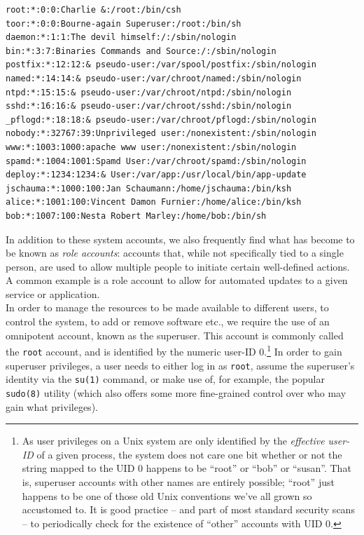 \begin{lstlisting}[float,label=code:cat-passwd,caption={Excerpt of a
typical {\tt /etc/passwd} file on a NetBSD system\index{\tt apache}}]
root:*:0:0:Charlie &:/root:/bin/csh
toor:*:0:0:Bourne-again Superuser:/root:/bin/sh
daemon:*:1:1:The devil himself:/:/sbin/nologin
bin:*:3:7:Binaries Commands and Source:/:/sbin/nologin
postfix:*:12:12:& pseudo-user:/var/spool/postfix:/sbin/nologin
named:*:14:14:& pseudo-user:/var/chroot/named:/sbin/nologin
ntpd:*:15:15:& pseudo-user:/var/chroot/ntpd:/sbin/nologin
sshd:*:16:16:& pseudo-user:/var/chroot/sshd:/sbin/nologin
_pflogd:*:18:18:& pseudo-user:/var/chroot/pflogd:/sbin/nologin
nobody:*:32767:39:Unprivileged user:/nonexistent:/sbin/nologin
www:*:1003:1000:apache www user:/nonexistent:/sbin/nologin
spamd:*:1004:1001:Spamd User:/var/chroot/spamd:/sbin/nologin
deploy:*:1234:1234:& User:/var/app:/usr/local/bin/app-update
jschauma:*:1000:100:Jan Schaumann:/home/jschauma:/bin/ksh
alice:*:1001:100:Vincent Damon Furnier:/home/alice:/bin/ksh
bob:*:1007:100:Nesta Robert Marley:/home/bob:/bin/sh
\end{lstlisting}

In addition to these system accounts, we also
frequently find what has become to be known as {\em
role accounts}: accounts that,
while not specifically tied to a single person, are
used to allow multiple people to initiate certain
well-defined actions.  A common example is a role
account to allow for automated updates to a given
service or application. \\

In order to manage the resources to be made available
to different users, to control the system, to add or
remove software etc., we require the use of an
omnipotent account, known as the
superuser.  This account is commonly
called the {\tt root} account, and is identified by
the numeric user-ID 0.\footnote{As user privileges
on a Unix system are only identified by the {\em
effective user-ID} of a given process, the system does
not care one bit whether or not the string mapped to
the UID 0 happens to be ``root'' or ``bob'' or
``susan''. That is, superuser accounts with other
names are entirely possible; ``root'' just happens to
be one of those old Unix conventions we've all grown
so accustomed to.  It is good practice -- and part of
most standard security scans -- to periodically check
for the existence of ``other'' accounts with UID 0.}
In order to gain superuser privileges, a user needs to
either log in as {\tt root}, assume the superuser's
identity via the {\tt su(1)}
command, or make use of, for example, the popular {\tt
sudo(8)} utility (which also
offers some more fine-grained control over who may
gain what privileges).

